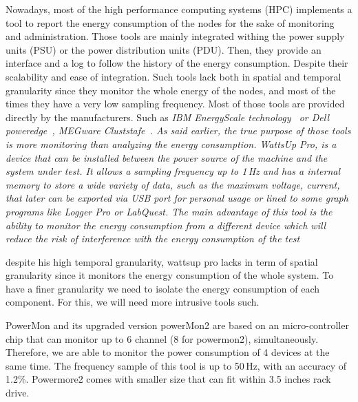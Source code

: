 Nowadays, most of the high performance computing systems (HPC) implements a tool to report the energy consumption of the nodes for the sake of monitoring and administration.
Those tools are mainly integrated withing the power supply units (PSU) or the power distribution units (PDU).
Then, they provide an interface and a log to follow the history of the energy consumption.
Despite their scalability and ease of integration.
Such tools lack both in spatial and temporal granularity since they monitor the whole energy of the nodes, and most of the times they have a very low sampling frequency.
Most of those tools are provided directly by the manufacturers.
Such as \em{IBM EnergyScale technology}~\cite{mccreary2007energyscale,caldeira2014ibm,caldeiraibm} or \em{Dell poweredge}~\cite{lovicott2009thermal}, MEGware Cluststafe~\cite{breitbart2015case}.
As said earlier, the true purpose of those tools is more monitoring than analyzing the energy consumption.
WattsUp Pro, is a device that can be installed between the power source of the machine and the system under test.
It allows a sampling frequency up to 1\,Hz and has a internal memory to store a wide variety of data, such as the maximum voltage, current, that later can be exported via USB port for personal usage or lined to some graph programs like Logger Pro or LabQuest.
The main advantage of this tool is the ability to monitor the energy consumption from a different device which will reduce the risk of interference with the energy consumption of the test %
\cite{hirst2013watts}

despite his high temporal granularity, wattsup pro lacks in term of spatial granularity since it monitors the energy consumption of the whole system.
To have a finer granularity we need to isolate the energy consumption of each component.
For this, we will need more intrusive tools such.



PowerMon and its upgraded version powerMon2 \cite{bedard2010powermon} are based on an micro-controller chip that can monitor up to 6 channel (8 for powermon2), simultaneously.
Therefore, we are able to monitor the power consumption of 4 devices at the same time.
The frequency sample of this tool is up to 50\,Hz, with an accuracy of 1.2\%.
Powermore2 comes with smaller size that can fit within 3.5 inches rack drive.

